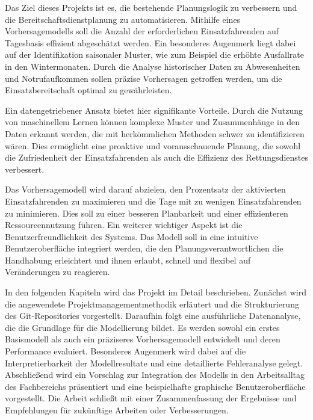 \documentclass[%
pdftex,
oneside,			%
11pt,				%
parskip=half,		%
headheight = 12pt,	%
headsepline,		%
footsepline,		%
footheight = 16pt,	%
abstracton,		%
DIV=calc,		%
BCOR=8mm,		%
headinclude=false,	%
footinclude=false,	%
listof=totoc,		%
toc=bibliography,	%
]{scrreprt}	%
\begin{document}
    Das Ziel dieses Projekts ist es, die bestehende Planungslogik zu verbessern und die Bereitschaftsdienstplanung zu automatisieren. 
    Mithilfe eines Vorhersagemodells soll die Anzahl der erforderlichen Einsatzfahrenden auf Tagesbasis effizient abgeschätzt werden. 
    Ein besonderes Augenmerk liegt dabei auf der Identifikation saisonaler Muster, wie zum Beispiel die erhöhte Ausfallrate in den Wintermonaten. 
    Durch die Analyse historischer Daten zu Abwesenheiten und Notrufaufkommen sollen präzise Vorhersagen getroffen werden, um die Einsatzbereitschaft optimal zu gewährleisten.
    
    Ein datengetriebener Ansatz bietet hier signifikante Vorteile. 
    Durch die Nutzung von maschinellem Lernen können komplexe Muster und Zusammenhänge in den Daten erkannt werden, die mit herkömmlichen Methoden schwer zu identifizieren wären. 
    Dies ermöglicht eine proaktive und vorausschauende Planung, die sowohl die Zufriedenheit der Einsatzfahrenden als auch die Effizienz des Rettungsdienstes verbessert.
    
    Das Vorhersagemodell wird darauf abzielen, den Prozentsatz der aktivierten Einsatzfahrenden zu maximieren und die Tage mit zu wenigen Einsatzfahrenden zu minimieren. 
    Dies soll zu einer besseren Planbarkeit und einer effizienteren Ressourcennutzung führen. 
    Ein weiterer wichtiger Aspekt ist die Benutzerfreundlichkeit des Systems. 
    Das Modell soll in eine intuitive Benutzeroberfläche integriert werden, die den Planungsverantwortlichen die Handhabung erleichtert und ihnen erlaubt, schnell und flexibel auf Veränderungen zu reagieren.
    
    In den folgenden Kapiteln wird das Projekt im Detail beschrieben. 
    Zunächst wird die angewendete Projektmanagementmethodik erläutert und die Strukturierung des Git-Repositories vorgestellt. 
    Daraufhin folgt eine ausführliche Datenanalyse, die die Grundlage für die Modellierung bildet. 
    Es werden sowohl ein erstes Basismodell als auch ein präziseres Vorhersagemodell entwickelt und deren Performance evaluiert. 
    Besonderes Augenmerk wird dabei auf die Interpretierbarkeit der Modellresultate und eine detaillierte Fehleranalyse gelegt. 
    Abschließend wird ein Vorschlag zur Integration des Modells in den Arbeitsalltag des Fachbereichs präsentiert und eine beispielhafte graphische Benutzeroberfläche vorgestellt. 
    Die Arbeit schließt mit einer Zusammenfassung der Ergebnisse und Empfehlungen für zukünftige Arbeiten oder Verbesserungen.
    
\end{document}
